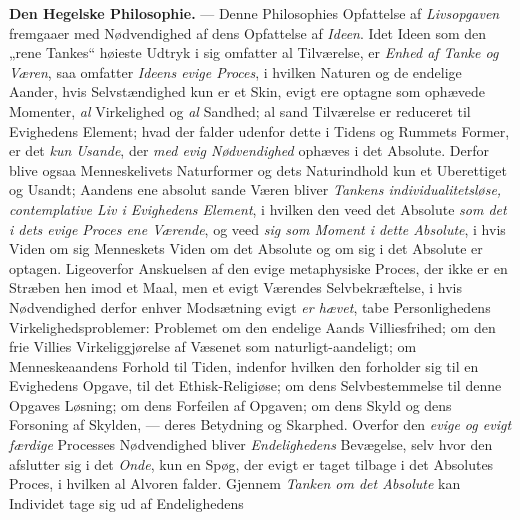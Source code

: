 \textbf{Den Hegelske Philosophie.} --- Denne Philosophies Opfattelse af
\emph{Livsopgaven} fremgaaer med Nødvendighed af dens Opfattelse af
\emph{Ideen}. Idet Ideen som den „rene Tankes“ høieste Udtryk i sig omfatter al
Tilværelse, er \emph{Enhed af Tanke og Væren}, saa omfatter \emph{Ideens evige
Proces}, i hvilken Naturen og de endelige Aander, hvis Selvstændighed kun er et
Skin, evigt ere optagne som ophævede Momenter, \emph{al} Virkelighed og
\emph{al} Sandhed; al sand Tilværelse er reduceret til Evighedens Element; hvad
der falder udenfor dette i Tidens og Rummets Former, er det \emph{kun Usande},
der \emph{med evig Nødvendighed} ophæves i det Absolute. Derfor blive ogsaa
Menneskelivets Naturformer og dets Naturindhold kun et Uberettiget og Usandt;
Aandens ene absolut sande Væren bliver \emph{Tankens individualitetsløse,
contemplative Liv i Evighedens Element}, i hvilken den veed det Absolute
\emph{som det i dets evige Proces ene Værende}, og veed \emph{sig som Moment i
dette Absolute}, i hvis Viden om sig Menneskets Viden om det Absolute og om sig i
det Absolute er optagen. Ligeoverfor Anskuelsen af den evige metaphysiske Proces,
der ikke er en Stræben hen imod et Maal, men et evigt
 Værendes Selvbekræftelse, i hvis Nødvendighed derfor enhver Modsætning evigt
\emph{er hævet}, tabe Personlighedens Virkelighedsproblemer: Problemet om den
endelige Aands Villiesfrihed; om den frie Villies Virkeliggjørelse af Væsenet som
naturligt-aandeligt; om Menneskeaandens Forhold til Tiden, indenfor hvilken den
forholder sig til en Evighedens Opgave, til det Ethisk-Religiøse; om dens
Selvbestemmelse til denne Opgaves Løsning; om dens Forfeilen af Opgaven; om dens
Skyld og dens Forsoning af Skylden, --- deres Betydning og Skarphed. Overfor den
\emph{evige og evigt færdige} Processes Nødvendighed bliver \emph{Endelighedens}
Bevægelse, selv hvor den afslutter sig i det \emph{Onde}, kun en Spøg, der evigt
er taget tilbage i det Absolutes Proces, i hvilken al Alvoren falder. Gjennem
\emph{Tanken om det Absolute} kan Individet tage sig ud af Endelighedens
